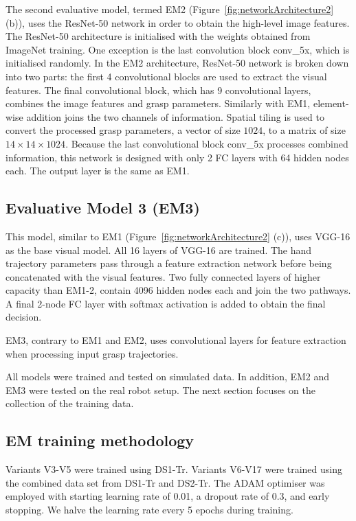 The second evaluative model, termed EM2 (Figure~\ref{fig:networkArchitecture2} (b)), uses the ResNet-50 network in order to obtain the high-level image features. The ResNet-50 architecture is initialised with the weights obtained from ImageNet training. One exception is the last convolution block conv\_5x, which is initialised randomly. In the EM2 architecture, ResNet-50 network is broken down into two parts: the first 4 convolutional blocks are used to extract the visual features. The final convolutional block, which has 9 convolutional layers, combines the image features and grasp parameters. Similarly with EM1, element-wise addition joins the two channels of information. Spatial tiling is used to convert the processed grasp parameters, a vector of size $1024$, to a matrix of size $14 \times 14 \times 1024$. Because the last convolutional block conv\_5x processes combined information, this network is designed with only 2 FC layers with 64 hidden nodes each. The output layer is the same as EM1. 

\subsection{Evaluative Model 3 (EM3)}

This model, similar to EM1 (Figure~\ref{fig:networkArchitecture2} (c)), uses VGG-16 as the base visual model. All 16 layers of VGG-16 are trained. The hand trajectory parameters pass through a feature extraction network before being concatenated with the visual features. Two fully connected layers of higher capacity than EM1-2, contain 4096 hidden nodes each and join the two pathways. A final 2-node FC layer with softmax activation is added to obtain the final decision.

EM3, contrary to EM1 and EM2, uses convolutional layers for feature extraction when processing input grasp trajectories. 

All models were trained and tested on simulated data. In addition, EM2 and EM3 were tested on the real robot setup. The next section focuses on the collection of the training data.

\subsection{EM training methodology}
Variants V3-V5 were trained using DS1-Tr. Variants V6-V17 were trained using the combined data set from DS1-Tr and DS2-Tr. The ADAM optimiser was employed with starting learning rate of 0.01, a dropout rate of 0.3, and early stopping. We halve the learning rate every 5 epochs during training.

